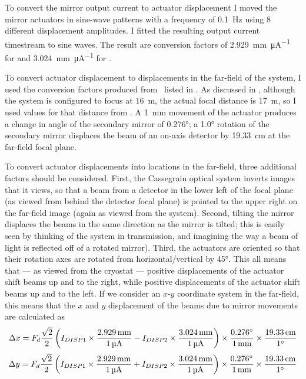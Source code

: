 To convert the mirror output current to actuator displacement I moved the mirror actuators in sine-wave patterns with a frequency of \SI{0.1}{\Hz} using 8 different displacement amplitudes.
I fitted the resulting output current timestream to sine waves.
The result are conversion factors of \SI{2.929}{\mm\per\uA} for  and \SI{3.024}{\mm\per\uA} for .

To convert actuator displacement to displacements in the far-field of the system, I used the conversion factors produced from \ZEMAX\ listed in .
As discussed in , although the system is configured to focus at \SI{16}{\m}, the actual focal distance is \SI{17}{\m}, so I used values for that distance from .
A \SI{1}{\mm} movement of the actuator produces a change in angle of the secondary mirror of \ang{0.276}; a \ang{1.0} rotation of the secondary mirror displaces the beam of an on-axis detector by \SI{19.33}{\cm} at the far-field focal plane.

To convert actuator displacements into locations in the far-field, three additional factors should be considered.
First, the Cassegrain optical system inverts images that it views, so that a beam from a detector in the lower left of the focal plane (as viewed from behind the detector focal plane) is pointed to the upper right on the far-field image (again as viewed from the system).
Second, tilting the mirror displaces the beams in the same direction as the mirror is tilted; this is easily seen by thinking of the system in transmission, and imagining the way a beam of light is reflected off of a rotated mirror).
Third, the actuators are oriented so that their rotation axes are rotated from horizontal/vertical by \ang{45}.
This all means that --- as viewed from the cryostat --- positive displacements of the  actuator shift beams up and to the right, while positive displacements of the  actuator shift beams up and to the left.
If we consider an $x$-$y$ coordinate system in the far-field, this means that the $x$ and $y$ displacement of the beams due to mirror movements are calculated as
\begin{equation}
\Delta x = F_d \frac{\sqrt{2}}{2} \left( I_{\DISP1} \times \frac{\SI{2.929}{\mm}}{\SI{1}{\uA}} -
                              I_{\DISP2} \times \frac{\SI{3.024}{\mm}}{\SI{1}{\uA}}  \right) \times
    \frac{\ang{0.276}} {\SI{1}{\mm}} \times
    \frac{\SI{19.33}{\cm}} {\ang{1}}
\end{equation}
\begin{equation}
\Delta y = F_d \frac{\sqrt{2}}{2} \left( I_{\DISP1} \times \frac{\SI{2.929}{\mm}}{\SI{1}{\uA}} +
                              I_{\DISP2} \times \frac{\SI{3.024}{\mm}}{\SI{1}{\uA}}  \right) \times
    \frac{\ang{0.276}} {\SI{1}{\mm}} \times
    \frac{\SI{19.33}{\cm}} {\ang{1}}
\end{equation}

